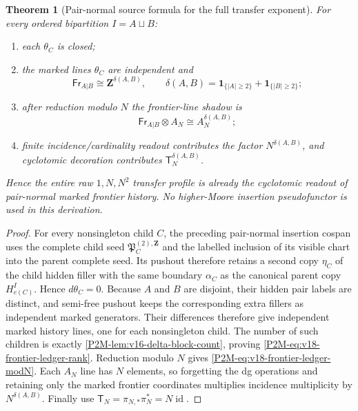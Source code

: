 \documentclass[11pt]{article}
\newtheorem{theorem}{Theorem}[section]
\theoremstyle{remark}
\newcommand{\Z}{\mathbf Z}
\begin{document}
\begin{theorem}[Pair-normal source formula for the full transfer exponent]
\label{P2M-thm:v18-pair-history-delta}
For every ordered bipartition $I=A\sqcup B$:
\begin{enumerate}[label=\textup{(\roman*)}]
\item each $\theta_C$ is closed;
\item the marked lines $\theta_C$ are independent and
\begin{equation}\label{P2M-eq:v18-frontier-ledger-rank}
 \boxed{
 \mathsf{Fr}_{A|B}\cong\Z^{\delta(A,B)},
 \qquad
 \delta(A,B)=
 \mathbf1_{\{|A|\ge2\}}+
 \mathbf1_{\{|B|\ge2\}};}
\end{equation}
\item after reduction modulo $N$ the frontier-line shadow is
\begin{equation}\label{P2M-eq:v18-frontier-ledger-modN}
 \boxed{
 \mathsf{Fr}_{A|B}\otimes A_N
 \cong A_N^{\delta(A,B)};}
\end{equation}
\item finite incidence/cardinality readout contributes the factor
$N^{\delta(A,B)}$, and cyclotomic decoration contributes
$\mathsf T_N^{\delta(A,B)}$.
\end{enumerate}
Hence the entire raw $1,N,N^2$ transfer profile is already the
cyclotomic readout of pair-normal marked frontier history.  No
higher-Moore insertion pseudofunctor is used in this derivation.
\end{theorem}

\begin{proof}
For every nonsingleton child $C$, the preceding pair-normal insertion cospan uses the complete child seed $\mathfrak P_C^{(2),\Z}$ and the labelled inclusion of its visible chart into the parent complete seed.  Its pushout therefore retains a second copy $\eta_C$ of the child hidden filler with the same boundary $\alpha_C$ as the canonical parent copy $H_{e(C)}^I$.  Hence $d\theta_C=0$.  Because $A$ and $B$ are disjoint, their hidden pair labels are distinct, and semi-free pushout keeps the corresponding extra fillers as independent marked generators.  Their differences therefore give independent marked history lines, one for each nonsingleton child.  The number
of such children is exactly \cref{P2M-lem:v16-delta-block-count}, proving
\eqref{P2M-eq:v18-frontier-ledger-rank}.  Reduction modulo $N$ gives
\eqref{P2M-eq:v18-frontier-ledger-modN}.  Each $A_N$ line has $N$ elements, so
forgetting the dg operations and retaining only the marked frontier
coordinates multiplies incidence multiplicity by $N^{\delta(A,B)}$.
Finally use $\mathsf T_N=\pi_{N,*}\pi_N^*=N\operatorname{id}$.
\end{proof}
\end{document}
